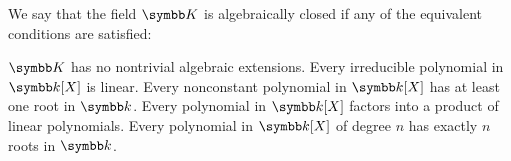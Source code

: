 \begin{definition}\label{def:algebraically_closed_field}\cite[proposition 9.20]{Knapp2016BAlg}
  We say that the field \( \K \) is algebraically closed if any of the equivalent conditions are satisfied:
  \begin{defenum}
     \( \K \) has no nontrivial algebraic extensions.
     Every irreducible polynomial in \( \Kl[X] \) is linear.
     Every nonconstant polynomial in \( \Kl[X] \) has at least one root in \( \Kl \).
     Every polynomial in \( \Kl[X] \) factors into a product of linear polynomials.
     Every polynomial in \( \Kl[X] \) of degree \( n \) has exactly \( n \) roots in \( \Kl \).
  \end{defenum}
\end{definition}
